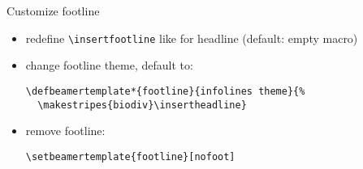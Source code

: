 \documentclass[aspectratio=169]{beamer}
\begin{document}
\begin{frame}[fragile]{Customize footline}
  \begin{itemize}
    \item redefine \Verb|\insertfootline| like for headline (default: empty macro)
    \item change footline theme, default to:
      \begin{Verbatim}[fontsize=\relsize{-2}]
\defbeamertemplate*{footline}{infolines theme}{%
  \makestripes{biodiv}\insertheadline}
      \end{Verbatim}
    \item remove footline:
      \begin{Verbatim}[fontsize=\relsize{-2}]
\setbeamertemplate{footline}[nofoot]
      \end{Verbatim}
  \end{itemize}
\end{frame}
\end{document}
